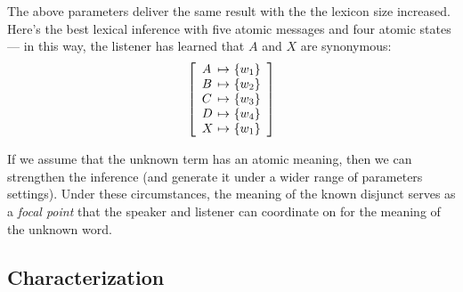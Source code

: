 \documentclass{article}
\begin{document}
\begin{examples}
\item The above parameters deliver the same result with the the
  lexicon size increased. Here's the best lexical inference with five
  atomic messages and four atomic states --- in this way, the 
  listener has learned that $A$ and $X$ are synonymous:
  \[
  \left[
    \begin{array}[c]{l@{ \ \mapsto \ }l}
      A & \set{w_{1}} \\
      B & \set{w_{2}} \\
      C & \set{w_{3}} \\
      D & \set{w_{4}} \\
      X & \set{w_{1}}
    \end{array}
  \right]
  \]  

\item If we assume that the unknown term has an atomic meaning, then
  we can strengthen the inference (and generate it under a wider range
  of parameters settings).  Under these circumstances, the meaning of
  the known disjunct serves as a \emph{focal point} that the speaker
  and listener can coordinate on for the meaning of the unknown word.
\end{examples}


\subsection{Characterization}\label{sec:analysis:characterization}
\end{document}
